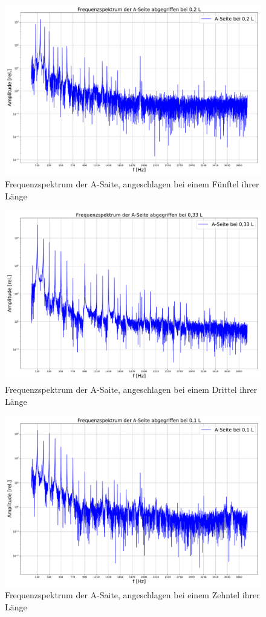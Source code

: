 \documentclass[a4paper, 11pt]{article}
\begin{document}
\begin{figure}[H]
	\centering
	\includegraphics[scale=0.35]{../Plots/A-0,2.pdf}
	\caption{Frequenzspektrum der A-Saite, angeschlagen bei einem Fünftel ihrer Länge}
	\label{fig:A-0,2}
\end{figure}
\begin{figure}[H]
	\centering
	\includegraphics[scale=0.35]{../Plots/A-0,33.pdf}
	\caption{Frequenzspektrum der A-Saite, angeschlagen bei einem Drittel ihrer Länge}
	\label{fig:A-0,33}
\end{figure}
\begin{figure}[H]
	\centering
	\includegraphics[scale=0.35]{../Plots/A-0,1.pdf}
	\caption{Frequenzspektrum der A-Saite, angeschlagen bei einem Zehntel ihrer Länge}
	\label{fig:A-0,1}
\end{figure}



\clearpage
\listoffigures
\listoftables
\end{document}
